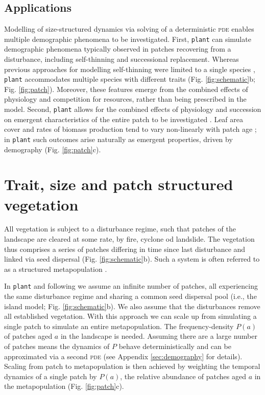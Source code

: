 \documentclass[a4paper,11pt]{article}
\newcommand{\plant}{\texttt{plant}}
\begin{document}
\subsection{Applications}

Modelling of size-structured dynamics via solving of a deterministic
\textsc{pde} enables multiple demographic phenomena to be
investigated. First, {\plant} can simulate demographic 
phenomena typically observed in patches
recovering from a disturbance, including self-thinning and
successional replacement. Whereas previous approaches for modelling
self-thinning were limited to a single species
\citep[e.g.][]{Barnes-2004, Coomes-2007}, {\plant} accommodates
multiple species with different traits (Fig. \ref{fig:schematic}b;
Fig.  \ref{fig:patch}). Moreover, these features emerge from the 
combined effects of physiology and competition for resources, rather 
than being prescribed in the model. Second, {\plant} allows for
the combined effects of physiology and succession on emergent 
characteristics of the entire patch to be investigated
\citep{Falster-2011}. Leaf area cover and rates of biomass 
production tend to vary  non-linearly with patch 
age \citep{Binkley-2002, Smith-2001, Ogawa-2010};
in {\plant} such outcomes arise naturally as emergent properties, 
driven by demography (Fig. \ref{fig:patch}c).

\section{Trait, size and patch structured vegetation}

All vegetation is subject to a disturbance regime, such that patches
of the landscape are cleared at some rate, by fire, cyclone od
landslide.  The vegetation thus comprises a series of patches
differing in time since last disturbance and linked via seed dispersal
(Fig.  \ref{fig:schematic}b). Such a system is often referred to as a
structured metapopulation \citep{Gyllenberg-2001}.

In {\plant} and following \citep{Kohyama-1993, Moorcroft-2001,
  Falster-2011} we assume an infinite number of patches, all experiencing
the same disturbance regime and sharing a common seed dispersal pool
(i.e., the island model; Fig. \ref{fig:schematic}b). We also assume
that the disturbances remove all established vegetation.  With this
approach we can scale up from simulating a single patch to simulate an
entire metapopulation.  The frequency-density \(P(a)\) of patches aged
\(a\) in the landscape is needed. Assuming there are a large number of
patches means the dynamics of \(P\) behave deterministically and can
be approximated via a second \textsc{pde} (see Appendix
\ref{sec:demography} for details). Scaling from patch to
metapopulation is then achieved by weighting the temporal dynamics of
a single patch by \(P(a)\), the relative abundance of patches aged
\(a\) in the metapopulation (Fig. \ref{fig:patch}c).
\end{document}
